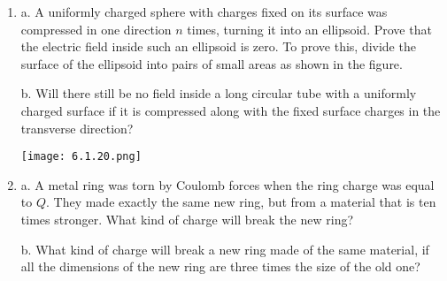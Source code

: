 \documentclass{article}
\begin{document}
\begin{enumerate}[label=6.1.\arabic*]
\item a. A uniformly charged sphere with charges fixed on its surface was compressed in one direction $n$ times, turning it into an ellipsoid. Prove that the electric field inside such an ellipsoid is zero. To prove this, divide the surface of the ellipsoid into pairs of small areas as shown in the figure. 

b. Will there still be no field inside a long circular tube with a uniformly charged surface if it is compressed along with the fixed surface charges in the transverse direction?

\begin{center}
    \texttt{[image: 6.1.20.png]}
\end{center}

\item a. A metal ring was torn by Coulomb forces when the ring charge was equal to $Q$. They made exactly the same new ring, but from a material that is ten times stronger. What kind of charge will break the new ring?

b. What kind of charge will break a new ring made of the same material, if all the dimensions of the new ring are three times the size of the old one?


\end{enumerate}
\end{document}
